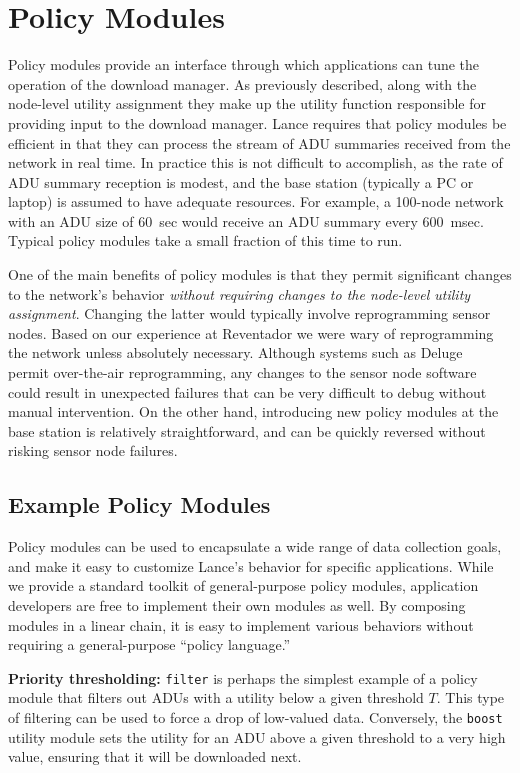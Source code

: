 \section{Policy Modules}
\label{sec-policymodules}

Policy modules provide an interface through which applications can tune the
operation of the download manager.  As previously described, along with the
node-level utility assignment they make up the utility function responsible
for providing input to the download manager.  Lance requires that policy
modules be efficient in that they can process the stream of ADU summaries
received from the network in real time. In practice this is not difficult
to accomplish, as the rate of ADU summary reception is modest, and the base
station (typically a PC or laptop) is assumed to have adequate resources.
For example, a 100-node network with an ADU size of 60~sec would receive an
ADU summary every 600~msec. Typical policy modules take a small fraction of
this time to run. 

One of the main benefits of policy modules is that they permit significant
changes to the network's behavior {\em without requiring changes to the
node-level utility assignment}. Changing the latter would typically involve
reprogramming sensor nodes. Based on our experience at Reventador we were
wary of reprogramming the network unless absolutely necessary. Although
systems such as Deluge~\cite{deluge} permit over-the-air reprogramming, any
changes to the sensor node software could result in unexpected failures that
can be very difficult to debug without manual intervention.  On the other
hand, introducing new policy modules at the base station is relatively
straightforward, and can be quickly reversed without risking sensor node
failures. 

\subsection{Example Policy Modules}

Policy modules can be used to encapsulate a wide range of data collection
goals, and make it easy to customize Lance's behavior for specific
applications. While we provide a standard toolkit of general-purpose policy
modules, application developers are free to implement their own modules as
well.  By composing modules in a linear chain, it is easy to implement
various behaviors without requiring a general-purpose ``policy language.'' 

{\bf Priority thresholding:}
{\tt filter} is perhaps the simplest example of a policy module that filters
out ADUs with a utility below a given threshold $T$.  This type of filtering
can be used to force a drop of low-valued data. Conversely, the {\tt boost}
utility module sets the utility for an ADU above a given threshold to a
very high value, ensuring that it will be downloaded next. 

